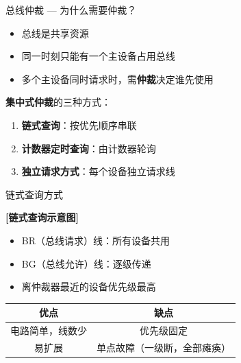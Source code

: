 \documentclass[10pt, aspectratio=169]{beamer}
\begin{document}
\begin{frame}{总线仲裁 --- 为什么需要仲裁？}
    \begin{itemize}
        \item 总线是共享资源
        \item 同一时刻只能有一个主设备占用总线
        \item 多个主设备同时请求时，需\textbf{仲裁}决定谁先使用
    \end{itemize}
    \vspace{0.5em}
    \textbf{集中式仲裁}的三种方式：
    \vspace{0.3em}
    \begin{enumerate}
        \item \textbf{链式查询}：按优先顺序串联
        \item \textbf{计数器定时查询}：由计数器轮询
        \item \textbf{独立请求方式}：每个设备独立请求线
    \end{enumerate}
\end{frame}

\begin{frame}{链式查询方式}
    \begin{center}
        \textbf{[链式查询示意图]}
    \end{center}
    \vspace{0.3em}
    \begin{itemize}
        \item BR（总线请求）线：所有设备共用
        \item BG（总线允许）线：逐级传递
        \item 离仲裁器最近的设备优先级最高
    \end{itemize}
    \vspace{0.3em}
    \begin{tabular}{|c|c|}
        \hline
        \textbf{优点} & \textbf{缺点} \\
        \hline
        电路简单，线数少 & 优先级固定 \\
        易扩展 & 单点故障（一级断，全部瘫痪） \\
        \hline
    \end{tabular}
\end{frame}
\end{document}
